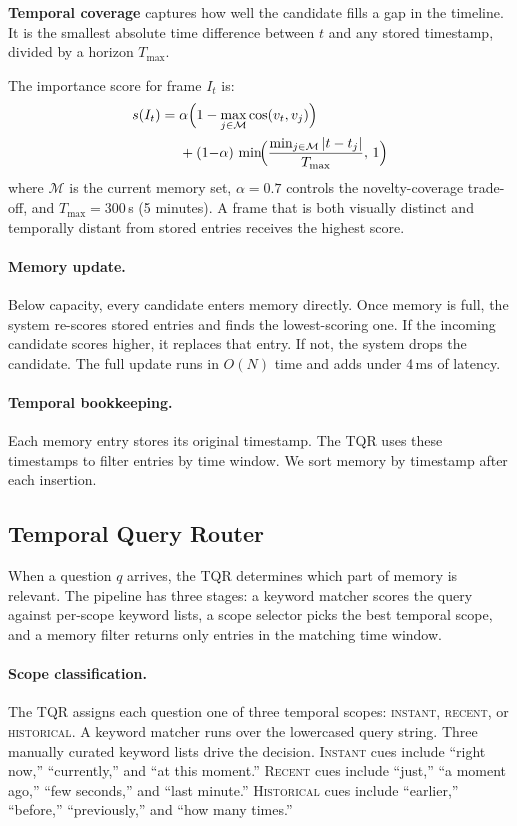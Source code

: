 \textbf{Temporal coverage} captures how well the candidate fills a gap in the timeline. It is the smallest absolute time difference between $t$ and any stored timestamp, divided by a horizon $T_{\max}$.

The importance score for frame $I_t$ is:
\begin{equation}
\begin{split}
  s(I_t) =\; & \alpha \Bigl(1 - \max_{j \in \mathcal{M}} \cos(v_t, v_j)\Bigr) \\
  & + (1{-}\alpha)\,\min\!\Bigl(\frac{\min_{j \in \mathcal{M}} |t - t_j|}{T_{\max}},\, 1\Bigr)
\end{split}
  \label{eq:importance}
\end{equation}
where $\mathcal{M}$ is the current memory set, $\alpha = 0.7$ controls the novelty-coverage trade-off, and $T_{\max} = 300$\,s (5 minutes). A frame that is both visually distinct and temporally distant from stored entries receives the highest score.

\paragraph{Memory update.}
Below capacity, every candidate enters memory directly.
Once memory is full, the system re-scores stored entries and finds the lowest-scoring one. If the incoming candidate scores higher, it replaces that entry. If not, the system drops the candidate. The full update runs in $O(N)$ time and adds under 4\,ms of latency.

\paragraph{Temporal bookkeeping.}
Each memory entry stores its original timestamp. The TQR uses these timestamps to filter entries by time window. We sort memory by timestamp after each insertion.


\subsection{Temporal Query Router}
\label{sec:tqr}

When a question $q$ arrives, the TQR determines which part of memory is relevant.
The pipeline has three stages: a keyword matcher scores the query against per-scope keyword lists, a scope selector picks the best temporal scope, and a memory filter returns only entries in the matching time window.

\paragraph{Scope classification.}
The TQR assigns each question one of three temporal scopes: \textsc{instant}, \textsc{recent}, or \textsc{historical}.
A keyword matcher runs over the lowercased query string.
Three manually curated keyword lists drive the decision. \textsc{Instant} cues include ``right now,'' ``currently,'' and ``at this moment.'' \textsc{Recent} cues include ``just,'' ``a moment ago,'' ``few seconds,'' and ``last minute.'' \textsc{Historical} cues include ``earlier,'' ``before,'' ``previously,'' and ``how many times.''

